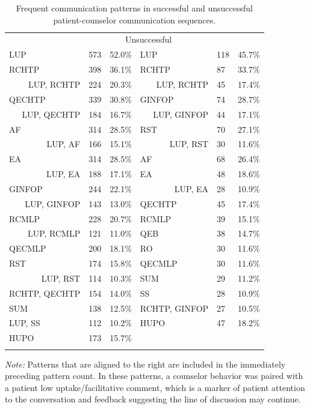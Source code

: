 \begin{table}
\begin{threeparttable}
\caption{Frequent communication patterns in successful and unsuccessful patient-counselor communication sequences.}
\label{tab:patterns}   
\begin{tabularx}{\textwidth}{p{3cm}XX@{\extracolsep{4pt}}p{3cm}XX}
\hline\noalign{\smallskip}
\multicolumn{3}{c}{Successful} & \multicolumn{3}{c}{Unsuccessful} \\
\noalign{\smallskip}\cline{1-3} \cline{4-6}\noalign{\smallskip}
LUP & 573 & 52.0\% & LUP & 118 & 45.7\%  \\
RCHTP & 398 & 36.1\% & RCHTP & 87 & 33.7\% \\ 
\multicolumn{1}{r}{LUP, RCHTP} & 224 & 20.3\% & \multicolumn{1}{r}{LUP, RCHTP} & 45 & 17.4\% \\
QECHTP & 339 & 30.8\% & GINFOP & 74 & 28.7\% \\
\multicolumn{1}{r}{LUP, QECHTP} & 184 & 16.7\% & \multicolumn{1}{r}{LUP, GINFOP} & 44 & 17.1\% \\
AF & 314 & 28.5\% & RST & 70 & 27.1\% \\
\multicolumn{1}{r}{LUP, AF} & 166 & 15.1\% & \multicolumn{1}{r}{LUP, RST} & 30 & 11.6\% \\
EA & 314 & 28.5\% & AF & 68 & 26.4\% \\
\multicolumn{1}{r}{LUP, EA} & 188 & 17.1\% & EA & 48 & 18.6\% \\
GINFOP & 244 & 22.1\% & \multicolumn{1}{r}{LUP, EA} & 28 & 10.9\% \\
\multicolumn{1}{r}{LUP, GINFOP} & 143 & 13.0\% & QECHTP & 45 & 17.4\% \\
RCMLP & 228 & 20.7\% & RCMLP & 39 & 15.1\% \\
\multicolumn{1}{r}{LUP, RCMLP} & 121 & 11.0\% & QEB & 38 & 14.7\% \\
QECMLP & 200 & 18.1\% & RO & 30 & 11.6\% \\
RST & 174 & 15.8\% & QECMLP & 30 & 11.6\% \\
\multicolumn{1}{r}{LUP, RST} & 114 & 10.3\% & SUM & 29 & 11.2\% \\
RCHTP, QECHTP & 154 & 14.0\% & SS & 28 & 10.9\% \\
SUM & 138 & 12.5\% & RCHTP, GINFOP & 27 & 10.5\% \\
LUP, SS & 112 & 10.2\% & HUPO & 47 & 18.2\% \\
HUPO & 173 & 15.7\% &  &  &  \\ 
\noalign{\smallskip}\hline
\end{tabularx}
\begin{tablenotes}
      \small
      \item \textit{Note:} Patterns that are aligned to the right are included in the immediately preceding pattern count. In these patterns, a counselor behavior was paired with a patient low uptake/facilitative comment, which is a marker of patient attention to the conversation and feedback suggesting the line of discussion may continue.
\end{tablenotes}
\end{threeparttable}
\end{table}

